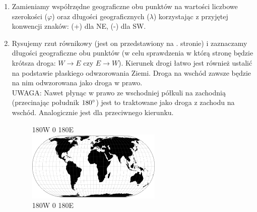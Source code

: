 \documentclass[10pt, twoside, fleqn]{article}
\begin{document}
		\begin{enumerate}
				\item	Zamieniamy współrzędne geograficzne obu punktów na 
						wartości liczbowe szerokości ($\varphi$) oraz długości
						geograficznych ($\lambda$) korzystając z przyjętej 
						konwencji znaków: (+) dla NE, (-) dla SW.
						
				\item	Rysujemy rzut równikowy (jest on przedstawiony na
						\pageref{fig:e-w}. stronie) i zaznaczamy 
						długości geograficzne
						obu punktów (w celu sprawdzenia w którą stronę będzie
						krótsza droga: $ W \rightarrow E$ czy $ E \rightarrow W$).
						Kierunek drogi łatwo jest również
						ustalić na podstawie płaskiego
						odwzorowania Ziemi. Droga na wschód zawsze będzie na nim
						odwzorowana jako droga w prawo.
						\\UWAGA: Nawet płynąc
						w prawo ze wschodniej półkuli na zachodnią (przecinając
						południk $180\degree$) jest to traktowane jako droga z
						zachodu na wschód. Analogicznie jest dla 
						przeciwnego kierunku.
					
						\vspace{10pt}
						\begin{figure}[h!]
						\centering
  							\tiny{180\degree W 	\hspace{30pt} 
  							0\degree		\hspace{30pt}
  							180\degree E \\}
  							\includegraphics[height=95pt]
  											{mapa_plaska.png}
  							\\
  							\tiny{180\degree W 	\hspace{30pt} 
  							0\degree		\hspace{30pt}
  							180\degree E \\}
						\end{figure}	
						\vspace{10pt}
						

\end{enumerate}
\end{document}
